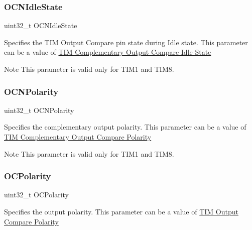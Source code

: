 \subsubsection{\texorpdfstring{O\+C\+N\+Idle\+State}{OCNIdleState}}
{\footnotesize\ttfamily uint32\+\_\+t O\+C\+N\+Idle\+State}

Specifies the T\+IM Output Compare pin state during Idle state. This parameter can be a value of \hyperlink{group___t_i_m___output___compare___n___idle___state}{T\+IM Complementary Output Compare Idle State} \begin{DoxyNote}{Note}
This parameter is valid only for T\+I\+M1 and T\+I\+M8. 
\end{DoxyNote}
\mbox{\label{struct_t_i_m___o_c___init_type_def_a978da9dd7cda80eb5fe8d04828b9bbcc}} 
\subsubsection{\texorpdfstring{O\+C\+N\+Polarity}{OCNPolarity}}
{\footnotesize\ttfamily uint32\+\_\+t O\+C\+N\+Polarity}

Specifies the complementary output polarity. This parameter can be a value of \hyperlink{group___t_i_m___output___compare___n___polarity}{T\+IM Complementary Output Compare Polarity} \begin{DoxyNote}{Note}
This parameter is valid only for T\+I\+M1 and T\+I\+M8. 
\end{DoxyNote}
\mbox{\label{struct_t_i_m___o_c___init_type_def_a781c7dae9dec8b6c974b1bdf591b77e7}} 
\subsubsection{\texorpdfstring{O\+C\+Polarity}{OCPolarity}}
{\footnotesize\ttfamily uint32\+\_\+t O\+C\+Polarity}

Specifies the output polarity. This parameter can be a value of \hyperlink{group___t_i_m___output___compare___polarity}{T\+IM Output Compare Polarity} \mbox{\label{struct_t_i_m___o_c___init_type_def_a5251c3bce4ca5baf013bc0ace0865a4c}} 
